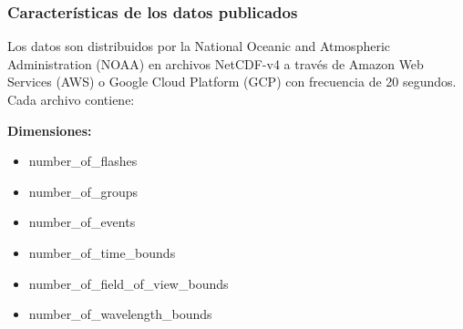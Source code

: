 \subsubsection{Características de los datos publicados}
Los datos son distribuidos por la National Oceanic and Atmospheric 
Administration (NOAA) en archivos NetCDF-v4 a través de Amazon Web Services 
(AWS) o Google Cloud Platform (GCP) con frecuencia de 20 segundos. Cada archivo 
contiene:

\textbf{Dimensiones: }
\begin{itemize}
  \item number\_of\_flashes
  \item number\_of\_groups
  \item number\_of\_events
  \item number\_of\_time\_bounds
  \item number\_of\_field\_of\_view\_bounds
  \item number\_of\_wavelength\_bounds
\end{itemize}

